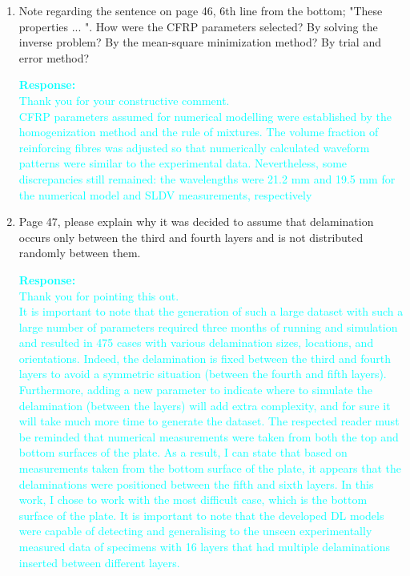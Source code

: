 \documentclass[11pt,a2paper]{report}
\begin{document}
{\begin{enumerate}
		\item Note regarding the sentence on page 46, 6th line from the bottom; "These properties ... ". 
		How were the CFRP parameters selected? By solving the inverse problem? By the mean-square minimization method? By trial and error method?
		
		\textcolor{Cyan}{
			\textbf{Response:}\\
			Thank you for your constructive comment. \\
			CFRP parameters assumed for numerical modelling were established by the homogenization method and the rule of mixtures. 
			The volume fraction of reinforcing fibres was adjusted so that numerically calculated waveform patterns were similar to the experimental data.
			Nevertheless, some discrepancies still remained: the wavelengths were 21.2 mm and 19.5 mm for the numerical model and SLDV measurements, respectively
			}	
		
		\item Page 47, please explain why it was decided to assume that delamination occurs only between the third and fourth layers and is not distributed randomly between them.
				
		\textcolor{Cyan}{
			\textbf{Response:} \\
			Thank you for pointing this out. \\
			It is important to note that the generation of such a large dataset with such a large number of parameters required three months of running and simulation and resulted in 475 cases with various delamination sizes, locations, and orientations.
			Indeed, the delamination is fixed between the third and fourth layers to avoid a symmetric situation (between the fourth and fifth layers).
			Furthermore, adding a new parameter to indicate where to simulate the delamination (between the layers) will add extra complexity, and for sure it will take much more time to generate the dataset.
			The respected reader must be reminded that numerical measurements were taken from both the top and bottom surfaces of the plate.
			As a result, I can state that based on measurements taken from the bottom surface of the plate, it appears that the delaminations were positioned between the fifth and sixth layers.
			In this work, I chose to work with the most difficult case, which is the bottom surface of the plate.
			It is important to note that the developed DL models were capable of detecting and generalising to the unseen experimentally measured data of specimens with 16 layers that had multiple delaminations inserted between different layers.
		}
	

\end{enumerate}}
\end{document}
